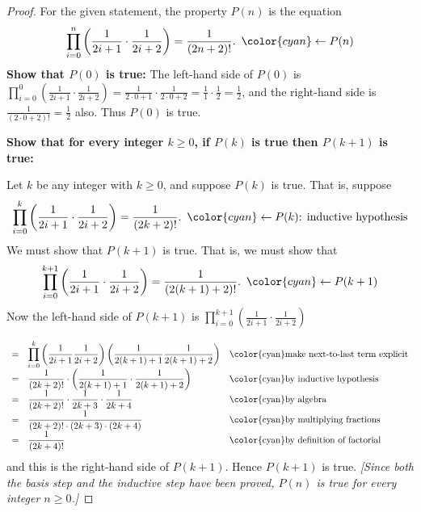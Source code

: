 \documentclass[14pt]{extarticle}
\newcommand{\dps}{\displaystyle}
\newcommand{\from}{\leftarrow}
\newcommand{\cy}{\color{cyan}}
\begin{document}
\begin{proof}
    For the given statement, the property $P(n)$ is the equation
    \[
        \dps \prod_{i=0}^{n}\left(\frac{1}{2i+1} \cdot \frac{1}{2i+2}\right) = \frac{1}{(2n+2)!}. \,\,\, {\cy \from P(n)}
    \]
    {\bf Show that $P(0)$ is true:} The left-hand side of $P(0)$ is $\dps \prod_{i=0}^{0}\left(\frac{1}{2i+1} \cdot \frac{1}{2i+2}\right) = \frac{1}{2\cdot0+1} \cdot \frac{1}{2\cdot0+2} = \frac{1}{1}\cdot \frac{1}{2} = \frac{1}{2}$, and the right-hand side is $\dps \frac{1}{(2\cdot 0 +2)!} = \frac{1}{2}$ also. Thus $P(0)$ is true.

        {\bf Show that for every integer $k \geq 0$, if $P(k)$ is true then $P(k + 1)$ is true:}

    Let $k$ be any integer with $k \geq 0$, and suppose $P(k)$ is true. That is, suppose
    \[
        \dps \prod_{i=0}^{k}\left(\frac{1}{2i+1} \cdot \frac{1}{2i+2}\right) = \frac{1}{(2k+2)!}. \,\,\, {\cy \from P(k) \text{: inductive hypothesis}}
    \]
    We must show that $P(k + 1)$ is true. That is, we must show that
    \[
        \dps \prod_{i=0}^{k+1}\left(\frac{1}{2i+1} \cdot \frac{1}{2i+2}\right) = \frac{1}{(2(k+1)+2)!}. \,\,\,{\cy \from P(k+1)}
    \]
    Now the left-hand side of $P(k + 1)$ is $\dps \prod_{i=0}^{k+1}\left(\frac{1}{2i+1} \cdot \frac{1}{2i+2}\right)$

    \[
        \begin{array}{lll}
            = & \dps \prod_{i=0}^{k}\left(\frac{1}{2i+1} \frac{1}{2i+2}\right) \left(\frac{1}{2(k+1)+1} \frac{1}{2(k+1)+2}\right) & \text{\cy make next-to-last term explicit} \\
            = & \dps \frac{1}{(2k+2)!} \cdot \left(\frac{1}{2(k+1)+1} \cdot \frac{1}{2(k+1)+2}\right)                             & \text{\cy by inductive hypothesis}         \\
            = & \dps \frac{1}{(2k+2)!} \cdot \frac{1}{2k+3} \cdot \frac{1}{2k+4}                                                  & \text{\cy by algebra}                      \\
            = & \dps \frac{1}{(2k+2)!\cdot(2k+3)\cdot(2k+4)}                                                                      & \text{\cy by multiplying fractions}        \\
            = & \dps \frac{1}{(2k+4)!}                                                                                            & \text{\cy by definition of factorial}
        \end{array}
    \]
    and this is the right-hand side of $P(k + 1)$. Hence $P(k + 1)$ is true. {\it [Since both the basis step and the inductive step have been proved, $P(n)$ is true for every integer $n \geq 0$.]}
\end{proof}
\end{document}
